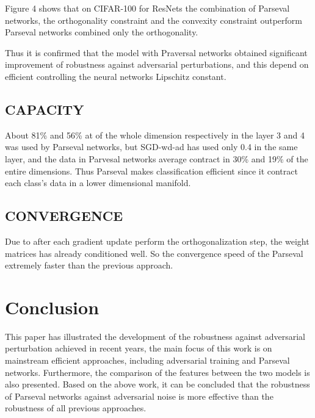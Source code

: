 Figure 4 shows that on CIFAR-100 for ResNets the combination of Parseval networks, the orthogonality constraint and the convexity constraint outperform Parseval networks combined only the orthogonality.

Thus it is confirmed that the model with Praversal networks obtained significant improvement of robustness against adversarial perturbations, and this depend on efficient controlling the neural networks Lipschitz constant.

\section{CAPACITY}

About 81\% and 56\% at of the whole dimension respectively in the layer 3 and 4 was used by Parseval networks, but SGD-wd-ad has used only 0.4 in the same layer, and the data in Parvesal networks average contract in 30\% and 19\% of the entire dimensions. Thus Parseval makes classification efficient since it contract each class's data in a lower dimensional manifold.

\section{CONVERGENCE}

Due to after each gradient update perform the orthogonalization step, the weight matrices has already conditioned well. So the convergence speed of the Parseval extremely faster than the previous approach.

\chapter{Conclusion}

This paper has illustrated the development of the robustness against adversarial perturbation achieved in recent years, the main focus of this work is on mainstream efficient approaches, including adversarial training and Parseval networks. Furthermore, the comparison of the features between the two models is also presented. Based on the above work, it can be concluded that the robustness of Parseval networks against adversarial noise is more effective than the robustness of all previous approaches.
